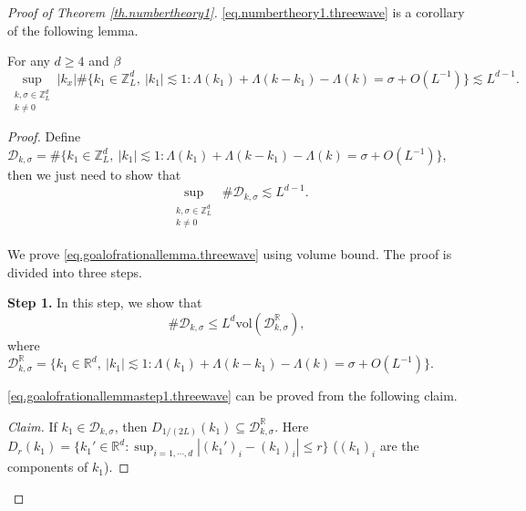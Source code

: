 \begin{proof}[Proof of Theorem \ref{th.numbertheory1}]\eqref{eq.numbertheory1.threewave} is a corollary of the following lemma. 

\begin{lem}\label{lem.rationallemma} For any $d\ge 4$ and $\beta$
\begin{equation}
    \sup_{\substack{k,\sigma\in\mathbb{Z}_L^d\\k\ne 0}} |k_x| \#\{k_1\in\mathbb{Z}^d_L,\ |k_1|\lesssim 1:\Lambda(k_1)+\Lambda(k-k_1)-\Lambda(k)=\sigma+O(L^{-1})\}\lesssim L^{d-1} .
\end{equation}
\end{lem}
\begin{proof}
Define $\mathcal{D}_{k,\sigma}=\#\{k_1\in\mathbb{Z}^d_L,\ |k_1|\lesssim 1:\Lambda(k_1)+\Lambda(k-k_1)-\Lambda(k)=\sigma+O(L^{-1})\}$, then we just need to show that 
\begin{equation}\label{eq.goalofrationallemma.threewave}
    \sup_{\substack{\substack{k,\sigma\in\mathbb{Z}_L^d\\k\ne 0}}} \#\mathcal{D}_{k,\sigma}\lesssim L^{d-1} .
\end{equation}

We prove \eqref{eq.goalofrationallemma.threewave} using volume bound. The proof is divided into three steps.





\textbf{Step 1.} In this step, we show that 
\begin{equation}\label{eq.goalofrationallemmastep1.threewave}
    \#\mathcal{D}_{k,\sigma}\le L^{d} \text{vol}(\mathcal{D}^{\mathbb{R}}_{k,\sigma}),
\end{equation}
where $\mathcal{D}^{\mathbb{R}}_{k,\sigma}=\{k_1\in \mathbb{R}^d,\ |k_1|\lesssim 1:\Lambda(k_1)+\Lambda(k-k_1)-\Lambda(k)=\sigma+O(L^{-1})\}$.

\eqref{eq.goalofrationallemmastep1.threewave} can be proved from the following claim.

\textit{Claim.} If $k_1\in \mathcal{D}_{k,\sigma}$, then $D_{1/(2L)}(k_1)\subseteq \mathcal{D}^{\mathbb{R}}_{k,\sigma}$. Here  $D_{r}(k_1)=\{k_1'\in \mathbb{R}^d: \sup_{i=1,\cdots, d} |(k_1')_i-(k_1)_i|\le r\}$ ($(k_1)_i$ are the components of $k_1$). 


\end{proof}
\end{proof}
